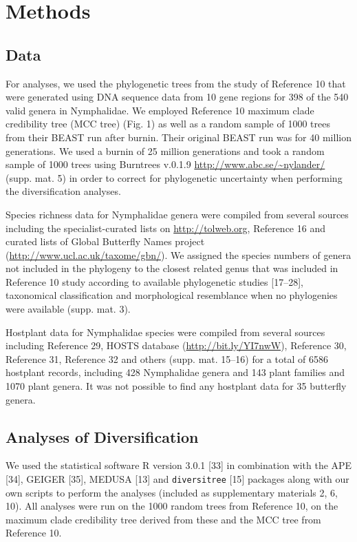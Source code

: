 \documentclass[10pt]{article}
\begin{document}
\section*{Methods}

\subsection*{Data}

For analyses, we used the phylogenetic trees from the study of Reference
10 that were generated using DNA sequence data from 10 gene regions for
398 of the 540 valid genera in Nymphalidae. We employed Reference 10
maximum clade credibility tree (MCC tree) (Fig. 1) as well as a random
sample of 1000 trees from their BEAST run after burnin. Their original
BEAST run was for 40 million generations. We used a burnin of 25 million
generations and took a random sample of 1000 trees using Burntrees
v.0.1.9 \url{http://www.abc.se/~nylander/} (supp. mat. 5) in order to
correct for phylogenetic uncertainty when performing the diversification
analyses.

Species richness data for Nymphalidae genera were compiled from several
sources including the specialist-curated lists on
\url{http://tolweb.org}, Reference 16 and curated lists of Global
Butterfly Names project (\url{http://www.ucl.ac.uk/taxome/gbn/}). We
assigned the species numbers of genera not included in the phylogeny to
the closest related genus that was included in Reference 10 study
according to available phylogenetic studies {[}17--28{]}, taxonomical
classification and morphological resemblance when no phylogenies were
available (supp. mat. 3).

Hostplant data for Nymphalidae species were compiled from several
sources including Reference 29, HOSTS database
(\url{http://bit.ly/YI7nwW}), Reference 30, Reference 31, Reference 32
and others (supp. mat. 15--16) for a total of 6586 hostplant records,
including 428 Nymphalidae genera and 143 plant families and 1070 plant
genera. It was not possible to find any hostplant data for 35 butterfly
genera.

\subsection*{Analyses of
Diversification}

We used the statistical software R version 3.0.1 {[}33{]} in combination
with the APE {[}34{]}, GEIGER {[}35{]}, MEDUSA {[}13{]} and
\texttt{diversitree} {[}15{]} packages along with our own scripts to
perform the analyses (included as supplementary materials 2, 6, 10). All
analyses were run on the 1000 random trees from Reference 10, on the
maximum clade credibility tree derived from these and the MCC tree from
Reference 10.
\end{document}
